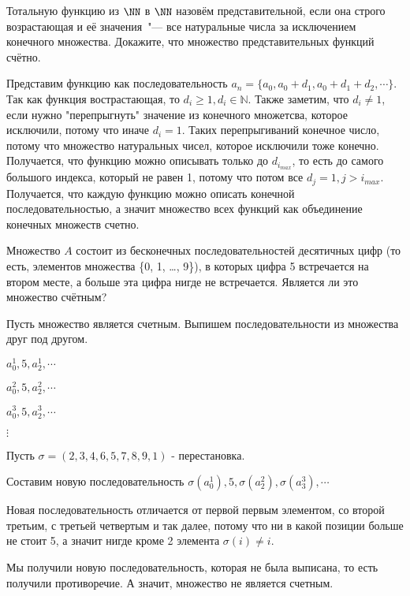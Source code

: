 \documentclass[11pt]{article}
\begin{document}
	\p Тотальную функцию из $\NN$ в $\NN$ назовём представительной, если она строго возрастающая и её значения~"--- все натуральные числа за исключением конечного множества. Докажите, что множество представительных  функций счётно.
	
	Представим функцию как последовательность $a_n = \{a_0, a_0 + d_1, a_0 + d_1 + d_2, \cdots\}$. Так как функция вострастающая, то $d_i  \geq 1, d_i \in \mathbb{N}$. Также заметим, что $d_i \neq 1$, если нужно "перепрыгнуть" \space значение из конечного множетсва, которое исключили, потому что иначе $d_i = 1$. Таких перепрыгиваний конечное число, потому что множество натуральных чисел, которое исключили тоже конечно. Получается, что функцию можно описывать только до $d_{i_{max}}$, то есть до самого большого индекса, который не равен 1, потому что потом все $d_j = 1, j > i_{max}$. Получается, что каждую функцию можно описать конечной последовательностью, а значит множество всех функций как объединение конечных множеств счетно. 
		
	\p Множество $A$ состоит из бесконечных последовательностей десятичных цифр (то есть,  элементов множества \{0, 1, \ldots, 9\}), в которых цифра 5 встречается на втором месте, а больше эта цифра нигде не встречается. Является ли это множество счётным?
	
	Пусть множество является счетным. Выпишем последовательности из множества друг под другом. 
	
	$a_0^1, 5, a_2^1, \cdots$
	
	$a_0^2, 5, a_2^2, \cdots$
	
	$a_0^3, 5, a_2^3, \cdots$
	
	$\vdots$
	
	Пусть $\sigma = (2,3,4,6,5,7,8,9,1)$ - перестановка. 
	
	Составим новую последовательность $\sigma(a_0^1), 5, \sigma(a_2^2), \sigma(a_3^3), \cdots$
	
	Новая последовательность отличается от первой первым элементом, со второй третьим, с третьей четвертым и так далее, потому что ни в какой позиции больше не стоит 5, а значит нигде кроме 2 элемента $\sigma(i) \neq i$.
	
	Мы получили новую последовательность, которая не была выписана, то есть получили противоречие. А значит, множество не является счетным. 
\end{document}

